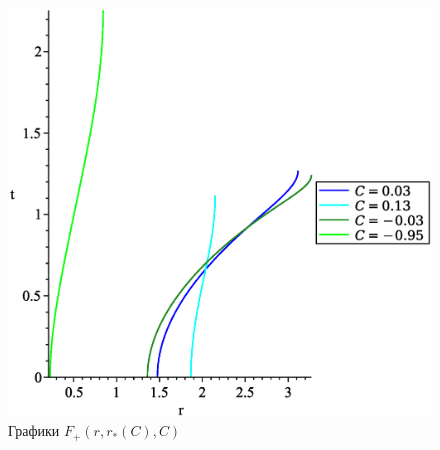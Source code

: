 \begin{figure}[ht!]
\begin{center}
\includegraphics[scale=0.48]{Frad.eps}
\caption{Графики $F_+(r, r_*(C), C)$}
\end{center}
\end{figure}

